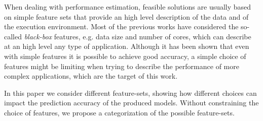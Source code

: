 \documentclass[a4paper, 10pt, conference]{ieeeconf}      %
\begin{document}
When dealing with performance estimation, feasible solutions are usually based on simple feature sets that provide an high level description of the data and of the execution environment. 
Most of the previous works have considered the so-called \textit{black-box} features, e.g. data size and number of cores, which can describe at an high level any type of application.
Although it has been shown that even with simple features it is possible to achieve good accuracy, a simple choice of features might be limiting when trying to describe the performance of more complex applications, which are the target of this work.

In this paper we consider different feature-sets, showing how different choices can impact the prediction accuracy of the produced models. Without constraining the choice of features, we propose a categorization of the possible feature-sets.
\end{document}
